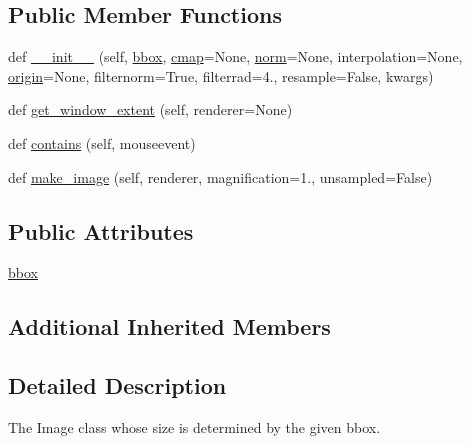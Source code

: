 \subsection*{Public Member Functions}
\begin{DoxyCompactItemize}
\item 
def \hyperlink{classmatplotlib_1_1image_1_1BboxImage_a953ed07bcfafce0d7fbd1572519a0fce}{\+\_\+\+\_\+init\+\_\+\+\_\+} (self, \hyperlink{classmatplotlib_1_1image_1_1BboxImage_abc42134894f4c67c3b23189c2f152118}{bbox}, \hyperlink{classmatplotlib_1_1cm_1_1ScalarMappable_a3684ebc12a81cc6f2599c0babd1d40af}{cmap}=None, \hyperlink{classmatplotlib_1_1cm_1_1ScalarMappable_a5507985e8c38feaa3d6972f75db09f73}{norm}=None, interpolation=None, \hyperlink{classmatplotlib_1_1image_1_1__ImageBase_aebc786349e152a9dc981ffde5bc39795}{origin}=None, filternorm=True, filterrad=4., resample=False, kwargs)
\item 
def \hyperlink{classmatplotlib_1_1image_1_1BboxImage_ae888c54fcab1ca0f6848d01dd3faa0c1}{get\+\_\+window\+\_\+extent} (self, renderer=None)
\item 
def \hyperlink{classmatplotlib_1_1image_1_1BboxImage_a1cad5391531e073d653b6806330bf864}{contains} (self, mouseevent)
\item 
def \hyperlink{classmatplotlib_1_1image_1_1BboxImage_ab578b9ce6e7deaa7d77d02c9a2883c2f}{make\+\_\+image} (self, renderer, magnification=1., unsampled=False)
\end{DoxyCompactItemize}
\subsection*{Public Attributes}
\begin{DoxyCompactItemize}
\item 
\hyperlink{classmatplotlib_1_1image_1_1BboxImage_abc42134894f4c67c3b23189c2f152118}{bbox}
\end{DoxyCompactItemize}
\subsection*{Additional Inherited Members}


\subsection{Detailed Description}
\begin{DoxyVerb}The Image class whose size is determined by the given bbox.\end{DoxyVerb}
 

